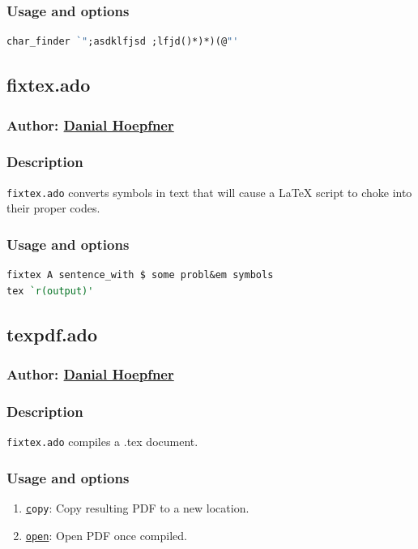 {\subsubsection{Usage and options}
\begin{lstlisting}[language=Stata, numbers=none]
char_finder `";asdklfjsd ;lfjd()*)*)(@"'
\end{lstlisting}


\subsection{fixtex.ado}
\subsubsection{Author: \href{mailto:dhoepfner@gibsonconsult.com}{Danial Hoepfner}}
\subsubsection{Description}
\texttt{fixtex.ado} converts symbols in text that will cause a \LaTeX{} script to choke into their proper codes.
\subsubsection{Usage and options}
\begin{lstlisting}[language=Stata, numbers=none]
fixtex A sentence_with $ some probl&em symbols
tex `r(output)'
\end{lstlisting}


\subsection{texpdf.ado}
\subsubsection{Author: \href{mailto:dhoepfner@gibsonconsult.com}{Danial Hoepfner}}
\subsubsection{Description}
\texttt{fixtex.ado} compiles a .tex document.
\subsubsection{Usage and options}
\begin{enumerate}
\item \texttt{\underline{c}opy}: Copy resulting PDF to a new location.
\item \texttt{\underline{open}}: Open PDF once compiled.
\end{enumerate}

}

